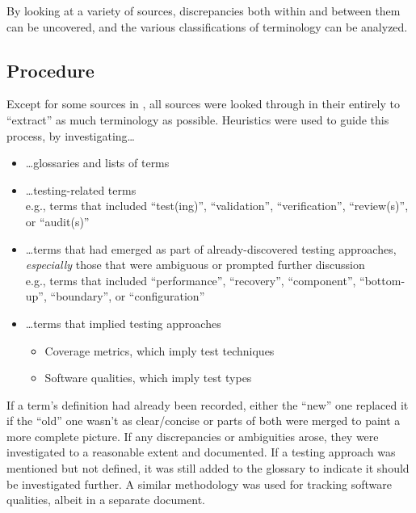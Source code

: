 By looking at a variety of sources, discrepancies both within and between them
can be uncovered, and the various classifications of terminology can be
analyzed.

\subsection{Procedure}

Except for some sources in , all sources were looked
through in their entirely to ``extract'' as much terminology as possible.
Heuristics were used to guide this process, by investigating\dots

\begin{itemize}
      \item \dots glossaries and lists of terms
      \item \dots testing-related terms\\
            e.g., terms that included ``test(ing)'', ``validation'',
            ``verification'', ``review(s)'', or ``audit(s)''
      \item \dots terms that had emerged as part of already-discovered
            testing approaches, \emph{especially} those that were ambiguous
            or prompted further discussion\\
            e.g., terms that included ``performance'', ``recovery'',
            ``component'', ``bottom-up'', ``boundary'', or ``configuration''
      \item \dots terms that implied testing approaches
            \begin{itemize}
                  \item Coverage metrics, which imply test techniques%
                  \item Software qualities, which imply test types
            \end{itemize}
\end{itemize}

If a term's definition had already been recorded, either the ``new'' one
replaced it if the ``old'' one wasn't as clear/concise or parts of both were
merged to paint a more complete picture. If any discrepancies or ambiguities
arose, they were investigated to a reasonable extent and documented. If a
testing approach was mentioned but not defined, it was still added to the
glossary to indicate it should be investigated further. A similar methodology
was used for tracking software qualities, albeit in a separate
document.

